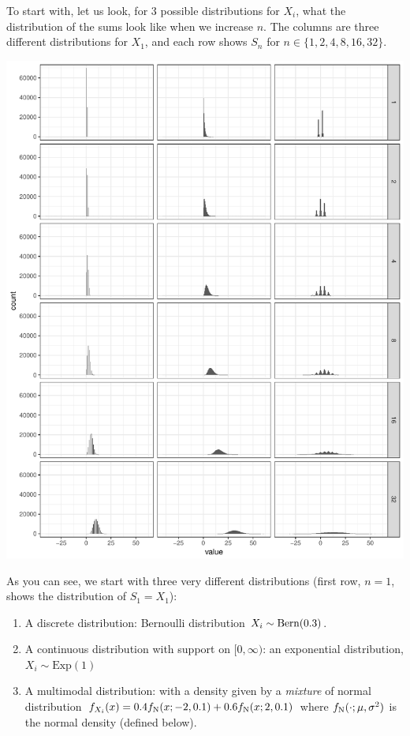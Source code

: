 \documentclass{article}
\begin{document}
 To start with, let us look, for 3 possible distributions for $X_i$, what the distribution of the sums look like when we increase $n$. The columns are three different distributions for $X_1$, and each row shows $S_n$ for $n \in \{1,2,4,8,16,32\}$.   
\begin{center}
	\includegraphics[width=1.0\linewidth]{figures/sums} 
\end{center}
As you can see, we start with three very different distributions (first row, $n=1$, shows the distribution of $S_1 = X_1$):
\begin{enumerate}
	\item A discrete distribution: Bernoulli distribution $X_i \sim \operatorname{Bern}(0.3)$.
	\item A continuous distribution with support on $[0, \infty)$: an exponential distribution, $X_i \sim \text{Exp}(1)$
	\item A multimodal distribution: with a density given by a \emph{mixture} of normal distribution $f_{X_i}(x) = 0.4 f_{\text{N}}(x; -2, 0.1) + 0.6 f_{\text{N}}(x; 2, 0.1)$ where $f_{\text{N}}(\cdot; \mu, \sigma^2)$ is the normal density (defined below).
\end{enumerate}
\end{document}
